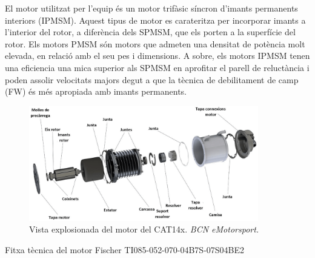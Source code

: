 {{        El motor utilitzat per l'equip és un motor trifàsic síncron d'imants
        permanents interiors (\acs{IPMSM}). Aquest tipus de motor es
        carateritza per incorporar imants a l'interior del rotor, a diferència
        dels SPMSM, que els porten a la superfície del rotor. Els motors
        \acs{PMSM} són motors que admeten una densitat de potència molt
        elevada, en relació amb el seu pes i dimensions. A sobre, els motors
        IPMSM tenen una eficiencia una mica superior als SPMSM en aprofitar el
        parell de reluctància i poden assolir velocitats majors degut a que la
        tècnica de debilitament de camp (FW) és més apropiada amb imants
        permanents.

        \begin{figure}[!htb]
            \centering
            \captionsetup{justification=centering, margin=1.5cm}
            \includegraphics[width=10cm]
                { img/2_formula_student/motor.png }
            \caption{ Vista explosionada del motor del CAT14x. \emph{BCN eMotorsport.}}
        \end{figure}

        \begin{table}[!htb]
            \caption{ Fitxa tècnica del motor Fischer TI085-052-070-04B7S-07S04BE2 }
            \label{motor}
            \centering
            \renewcommand{\arraystretch}{1.3}
            \tablefirsthead{}
            \tablehead{}
            \tabletail{}
            \tablelasttail{}
        

\end{table}}}
